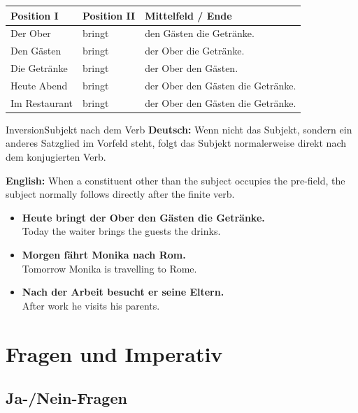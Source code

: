 \documentclass[a4paper,11pt]{article}
\newcommand{\GermanText}[1]{\textbf{Deutsch: }#1\par}
\newcommand{\EnglishText}[1]{{\small\color{SoftGray}\textbf{English: }#1\par}}
\newcommand{\ExampleItem}[2]{\item \textbf{#1}\\{\small\color{SoftGray}#2}}
\newcommand{\TableHeader}[1]{\color{white}\textbf{#1}}
\begin{document}
        \begin{longtable}{|p{3.4cm}|p{3.0cm}|p{8.0cm}|}
            \hline
            \rowcolor{HeaderBlueDark}
            \TableHeader{Position I} & \TableHeader{Position II} & \TableHeader{Mittelfeld / Ende} \\
            \hline
            Der Ober & bringt & den Gästen die Getränke. \\
            \hline
            Den Gästen & bringt & der Ober die Getränke. \\
            \hline
            Die Getränke & bringt & der Ober den Gästen. \\
            \hline
            Heute Abend & bringt & der Ober den Gästen die Getränke. \\
            \hline
            Im Restaurant & bringt & der Ober den Gästen die Getränke. \\
            \hline
        \end{longtable}
        
        \begin{grammarentry}{Inversion}{Subjekt nach dem Verb}
            \GermanText{Wenn nicht das Subjekt, sondern ein anderes Satzglied im Vorfeld steht, folgt das Subjekt normalerweise direkt nach dem konjugierten Verb.}
            \EnglishText{When a constituent other than the subject occupies the pre-field, the subject normally follows directly after the finite verb.}
        \end{grammarentry}
        
        \begin{exbox}
            \begin{itemize}
                \ExampleItem{Heute bringt der Ober den Gästen die Getränke.}{Today the waiter brings the guests the drinks.}
                \ExampleItem{Morgen fährt Monika nach Rom.}{Tomorrow Monika is travelling to Rome.}
                \ExampleItem{Nach der Arbeit besucht er seine Eltern.}{After work he visits his parents.}
            \end{itemize}
        \end{exbox}
    
    
    \section{Fragen und Imperativ}
        
        \subsection{Ja-/Nein-Fragen}
            
\end{document}
